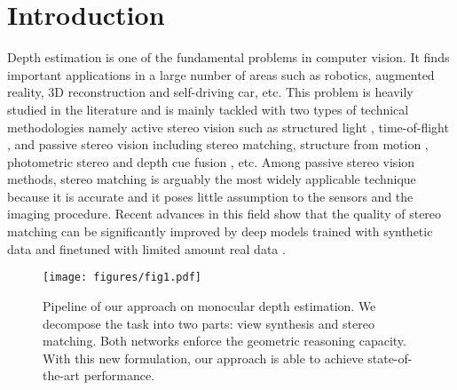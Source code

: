 \documentclass[10pt,twocolumn,letterpaper]{article}
\begin{document}
\vspace{-5pt}
\section{Introduction}
Depth estimation is one of the fundamental problems in computer vision. It finds important applications in a large number of areas such as robotics, augmented reality, 3D reconstruction and self-driving car, etc. This problem is heavily studied in the literature and is mainly tackled with two types of technical methodologies namely active stereo vision such as structured light \cite{ScharsteinS03light}, time-of-flight \cite{ZhuWYDP11TOF}, and passive stereo vision including stereo matching\cite{lad2015stereo,luo2016stereo}, structure from motion \cite{SturmT96sfm}, photometric stereo \cite{EstebanVC08} and depth cue fusion \cite{Saxena09make3D}, etc. Among passive stereo vision methods, stereo matching is arguably the most widely applicable technique because it is accurate and it poses little assumption to the sensors and the imaging procedure. Recent advances in this field show that the quality of stereo matching can be significantly improved by deep models trained with synthetic data and finetuned with limited amount real data \cite{mayer2016disp,pang2017cascade}. 

\begin{figure}[t!]
  \texttt{[image: figures/fig1.pdf]}
  \vspace{-5pt}
  \caption{Pipeline of our approach on monocular depth estimation. We decompose the task into two parts: view synthesis and stereo matching. Both networks enforce the geometric reasoning capacity. With this new formulation, our approach is able to achieve state-of-the-art performance.}
  \vspace{-13pt}
  \label{figure1}
\end{figure}
\end{document}
